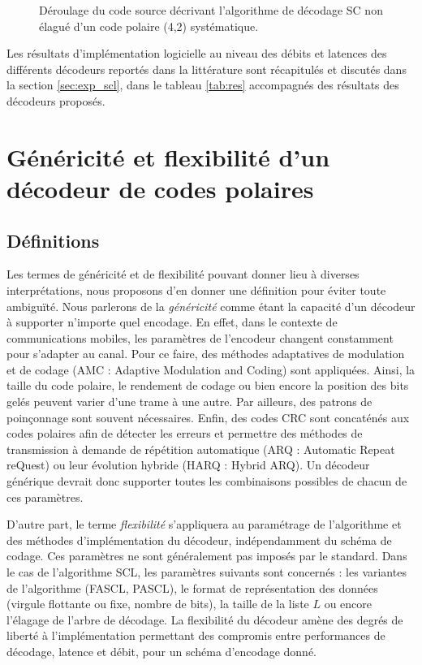 \begin{figure}[t]
{\begin{minipage}{.35\linewidth}
  \label{fig:unrolled_tree}
  \end{minipage}%
  }
  \caption{Déroulage du code source décrivant l'algorithme de décodage SC non élagué d'un code polaire (4,2) systématique.}
  \label{fig:unrolling}
\end{figure}

Les résultats d'implémentation logicielle au niveau des débits et latences des différents décodeurs reportés dans la littérature \cite{sarkis_increasing_2014,sarkis_fast_2016,shen_low-latency_2016} sont récapitulés et discutés dans la section \ref{sec:exp_scl}, dans le tableau \ref{tab:res} accompagnés des résultats des décodeurs proposés.

\section{Généricité et flexibilité d'un décodeur de codes polaires}
\label{sec:gen_scl}

\subsection{Définitions}
Les termes de généricité et de flexibilité pouvant donner lieu à diverses interprétations, nous proposons d'en donner une définition pour éviter toute ambiguïté.
Nous parlerons de la \textit{généricité} comme étant la capacité d'un décodeur à supporter n'importe quel encodage.
En effet, dans le contexte de communications mobiles, les paramètres de l'encodeur changent constamment pour s'adapter au canal. Pour ce faire, des méthodes adaptatives de modulation et de codage \cite{dahlman_4g:_2013} (AMC : Adaptive Modulation and Coding) sont appliquées. Ainsi, la taille du code polaire, le rendement de codage ou bien encore la position des bits gelés peuvent varier d'une trame à une autre. Par ailleurs, des patrons de poinçonnage sont souvent nécessaires. Enfin, des codes CRC sont concaténés aux codes polaires afin de détecter les erreurs et permettre des méthodes de transmission à demande de répétition automatique (ARQ : Automatic Repeat reQuest) ou leur évolution hybride (HARQ : Hybrid ARQ). Un décodeur générique devrait donc supporter toutes les combinaisons possibles de chacun de ces paramètres.

D'autre part, le terme \textit{flexibilité} s'appliquera au paramétrage de l'algorithme et des méthodes d'implémentation du décodeur, indépendamment du schéma de codage. Ces paramètres ne sont généralement pas imposés par le standard. Dans le cas de l'algorithme SCL, les paramètres suivants sont concernés : les variantes de l'algorithme (FASCL, PASCL), le format de représentation des données (virgule flottante ou fixe, nombre de bits), la taille de la liste $L$ ou encore l'élagage de l'arbre de décodage. La flexibilité du décodeur amène des degrés de liberté à l'implémentation permettant des compromis entre performances de décodage, latence et débit, pour un schéma d'encodage donné.

